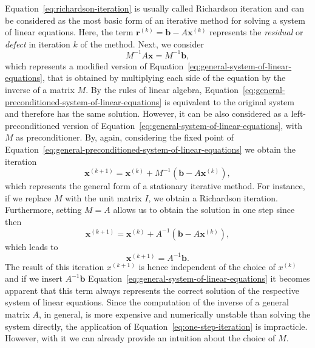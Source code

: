 Equation~\eqref{eq:richardson-iteration} is usually called Richardson iteration and can be considered as the most basic form of an iterative method for solving a system of linear equations.
Here, the term $\bm{r}^{(k)} = \bm{b} - A \bm{x}^{(k)}$ represents the \emph{residual} or \emph{defect} in iteration $k$ of the method.
Next, we consider 
\begin{equation}
	M^{-1} A \bm{x} = M^{-1} \bm{b},
	\label{eq:general-preconditioned-system-of-linear-equations}
\end{equation}
which represents a modified version of Equation~\eqref{eq:general-system-of-linear-equations}, that is obtained by multiplying each side of the equation by the inverse of a matrix $M$.
By the rules of linear algebra, Equation~\eqref{eq:general-preconditioned-system-of-linear-equations} is equivalent to the original system and therefore has the same solution.
However, it can be also considered as a left-preconditioned version of Equation~\eqref{eq:general-system-of-linear-equations}, with $M$ as preconditioner.
By, again, considering the fixed point of Equation~\eqref{eq:general-preconditioned-system-of-linear-equations} we obtain the iteration
\begin{equation}
	\bm{x}^{(k+1)} = \bm{x}^{(k)} + M^{-1}(\bm b - A \bm{x}^{(k)}),
	\label{eq:general-stationary-iterative-method}
\end{equation}
which represents the general form of a stationary iterative method. 
For instance, if we replace $M$ with the unit matrix $I$, we obtain a Richardson iteration.
Furthermore, setting $M = A$ allows us to obtain the solution in one step since then
\begin{equation}
	\bm{x}^{(k+1)} = \bm{x}^{(k)} + A^{-1}(\bm b - A \bm{x}^{(k)}),
	\label{eq:one-step-iteration}
\end{equation}
which leads to
\begin{equation}
	\bm{x}^{(k+1)} = A^{-1}\bm b.
\end{equation}
The result of this iteration $x^{(k+1)}$ is hence independent of the choice of $x^{(k)}$ and if we insert $A^{-1}\bm b$ Equation~\eqref{eq:general-system-of-linear-equations} it becomes apparent that this term always represents the correct solution of the respective system of linear equations.
Since the computation of the inverse of a general matrix $A$, in general, is more expensive and numerically unstable than solving the system directly, the application of Equation~\eqref{eq:one-step-iteration} is impracticle.
However, with it we can already provide an intuition about the choice of $M$.
